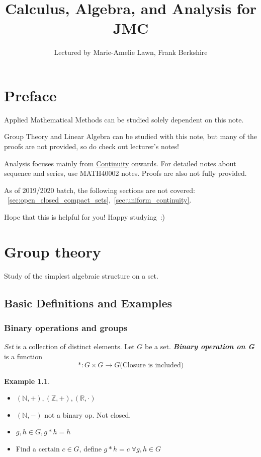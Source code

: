 \documentclass[12pt]{report}
\author{Lectured by Marie-Amelie Lawn, Frank Berkshire}
\title{Calculus, Algebra, and Analysis for JMC}
\affil{Typed by Aris Zhu Yi Qing}
\theoremstyle{definition}
\begin{document}
\maketitle
\tableofcontents

\chapter*{Preface}

Applied Mathematical Methods can be studied solely dependent on this note.

\medskip\noindent
Group Theory and Linear Algebra can be studied with this note,
but many of the proofs are not provided, so do check out lecturer's notes!

\medskip\noindent
Analysis focuses mainly from \hyperref[sec:continuity]{Continuity} onwards.
For detailed notes about sequence and series, use MATH40002 notes. 
Proofs are also not fully provided.

\medskip\noindent
As of 2019/2020 batch, the following sections are not covered:%
~\ref{sec:open_closed_compact_sets},~\ref{sec:uniform_continuity}.

\bigskip\noindent
Hope that this is helpful for you! Happy studying~:)%

\chapter{Group theory}

Study of the simplest algebraic structure on a set.

\section{Basic Definitions and Examples}

\subsection{Binary operations and groups}

\begin{theorem}
    \emph{Set} is a collection of distinct elements. Let $G$ be a set.
    \textbf{\emph{Binary operation on G}} is a function\[
        *: G \times G \rightarrow G \text{(Closure is included)}
    \]
\end{theorem}

\newtheorem{ex}[theorem]{Example}
\begin{ex}
    \;
    
    \begin{itemize}
        \item $(\mathbb{N}, +), (\mathbb{Z}, +), (\mathbb{R}, \cdot)$
        \item $(\mathbb{N}, -)$ not a binary op. Not closed.
        \item $g, h \in G, g * h = h$
        \item Find a certain $c \in G$, define $g*h = c \;\forall g, h \in G$
    \end{itemize}
    
\end{ex}
\end{document}
